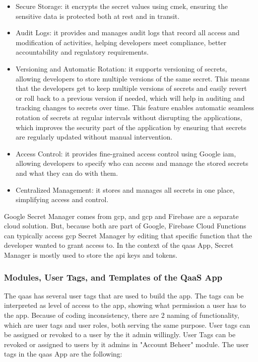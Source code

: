 \begin{itemize}
      \item Secure Storage: it encrypts the secret values using \acrshort{cmek}, ensuring the sensitive data is protected
            both at rest and in transit.
      \item Audit Logs: it provides and manages audit logs that record all access and modification of activities, helping
            developers meet compliance, better accountability and regulatory requirements.
      \item Versioning and Automatic Rotation: it supports versioning of secrets, allowing developers to store multiple versions
            of the same secret. This means that the developers get to keep multiple versions of secrets and easily revert or roll
            back to a previous version if needed, which will help in auditing and tracking changes to secrets over time. This feature
            enables automatic seamless rotation of secrets at regular intervals without  disrupting the applications, which improves
            the security part of the application by ensuring that secrets are regularly updated without manual intervention.
      \item Access Control: it provides fine-grained access control using Google \acrshort{iam}, allowing developers to specify
            who can access and manage the stored secrets and what they can do with them.
      \item Centralized Management: it stores and manages all secrets in one place, simplifying access and control.
\end{itemize}

Google Secret Manager comes from \acrshort{gcp}, and \acrshort{gcp} and Firebase are a separate cloud solution. But, because
both are part of Google, Firebase Cloud Functions can typically access \acrshort{gcp} Secret Manager by editing that specific function
that the developer wanted to grant access to. In the context of the \acrshort{qaas} App, Secret Manager is mostly used to store the
\acrshort{api} keys and tokens.

\subsubsection{Modules, User Tags, and Templates of the QaaS App} %

The \acrshort{qaas} has several user tags that are used to build the app. The tags can be interpreted as level of access to the app,
showing what permission a user has to the app. Because of coding inconsistency, there are 2 naming of functionality, which are user
tags and user roles, both serving the same purpose. User tags can be assigned or revoked to a user by the \acrshort{it} admin
willingly. User Tags can be revoked or assigned to users by \acrshort{it} admins in "Account Beheer" module. The user tags in
the \acrshort{qaas} App are the following:


